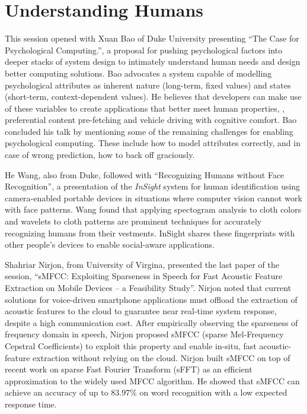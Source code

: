 \section{Understanding Humans}
\label{sec:humans}

This session opened with Xuan Bao of Duke University presenting ``The
Case for Psychological Computing.'', a proposal for pushing
psychological factors into deeper stacks of system design to intimately
understand human needs and design better computing solutions.  Bao
advocates a system capable of modelling psychological attributes as
inherent nature (long-term, fixed values) and states (short-term,
context-dependent values). He believes that developers can make use of
these variables to create applications that better meet human
properties, \eg, preferential content pre-fetching and vehicle driving
with cognitive comfort. Bao concluded his talk by mentioning some of the
remaining challenges for enabling psychological computing. These include
how to model attributes correctly, and in case of wrong prediction, how
to back off graciously.

He Wang, also from Duke, followed with ``Recognizing Humans without Face
Recognition'', a presentation of the \emph{InSight} system for human
identification using camera-enabled portable devices in situations where
computer vision cannot work with face patterns. Wang found that
applying spectogram analysis to cloth colors and wavelets to cloth
patterns are prominent techniques for accurately recognizing humans from
their vestments. InSight shares these fingerprints with other people's
devices to enable social-aware applications.

Shahriar Nirjon, from University of Virgina, presented the last paper of
the session, ``sMFCC: Exploiting Sparseness in Speech for Fast Acoustic
Feature Extraction on Mobile Devices -- a Feasibility Study''. Nirjon
noted that current solutions for voice-driven smartphone applications
must offload the extraction of acoustic features to the cloud to
guarantee near real-time system response, despite a high communication
cost. After empirically observing the sparseness of frequency domain in
speech, Nirjon proposed sMFCC (sparse Mel-Frequency Cepstral
Coefficients) to exploit this property and enable in-situ, fast
acoustic-feature extraction without relying on the cloud. Nirjon built
sMFCC on top of recent work on sparse Fast Fourier Transform (sFFT) as
an efficient approximation to the widely used MFCC algorithm. He showed
that sMFCC can achieve an accuracy of up to $83.97\%$ on word
recognition with a low expected response time.

